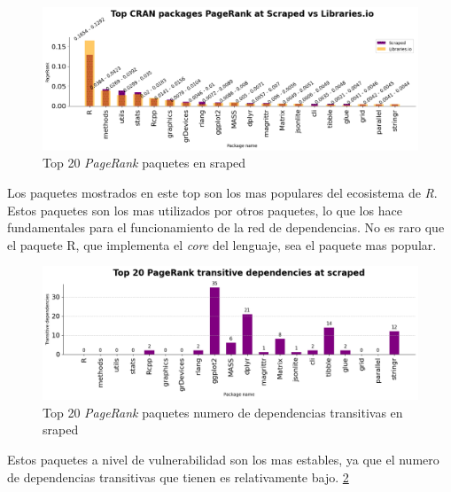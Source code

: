 \begin{figure}[h!]
    \begin{center}
        \includegraphics[width=1\textwidth]{img/cran/pr_inverted.png}
        \caption{Top 20 \textit{PageRank} paquetes en sraped}
        \label{fig:Top 20 PageRank paquetes en sraped}
    \end{center}
\end{figure}

Los paquetes mostrados en este top son los mas populares del ecosistema de \textit{R}.
Estos paquetes son los mas utilizados por otros paquetes, lo que los hace fundamentales para el
funcionamiento de la red de dependencias. No es raro que el paquete R, que implementa el \textit{core}
del lenguaje, sea el paquete mas popular.

\begin{figure}[h!]
    \begin{center}
        \includegraphics[width=1\textwidth]{img/cran/transitive_pr_scr.png}
        \caption{Top 20 \textit{PageRank} paquetes numero de dependencias transitivas en sraped}
        \label{fig:Top 20 PageRank paquetes numero de dependencias transitivas en sraped}
    \end{center}
\end{figure}

Estos paquetes a nivel de vulnerabilidad son los mas estables, ya que el numero de dependencias
transitivas que tienen es relativamente bajo. \ref{fig:Top 20 PageRank paquetes numero de dependencias transitivas en sraped}


